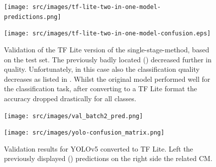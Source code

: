 \begin{figure}
    \centering
    \begin{multicols}{2}
        \begin{minipage}{.45\textwidth}
            \texttt{[image: src/images/tf-lite-two-in-one-model-predictions.png]}
        \end{minipage}
        \columnbreak
        \begin{minipage}{.45\textwidth}
            \texttt{[image: src/images/tf-lite-two-in-one-model-confusion.eps]}
        \end{minipage}
    \end{multicols}
    \caption{Validation of the TF Lite version of the single-stage-method, based on the test set. The previously badly located () decreased further in quality. Unfortunately, in this case also the classification quality decreases as listed in . Whilst the original model performed well for the classification task, after converting to a TF Lite format the accuracy dropped drastically for all classes.}
    \label{fig:tflite-single-stage-results}
\end{figure}

\begin{figure}
    \centering
    \begin{multicols}{2}
        \begin{minipage}{.45\textwidth}
            \texttt{[image: src/images/val\_batch2\_pred.png]}
        \end{minipage}
        \columnbreak
        \begin{minipage}{.45\textwidth}
            \texttt{[image: src/images/yolo-confusion\_matrix.png]}
        \end{minipage}
    \end{multicols}
    \caption{Validation results for YOLOv5 converted to TF Lite. Left the previously displayed () predictions on the right side the related CM.}
    \label{fig:yolo-validation-results}
\end{figure}
